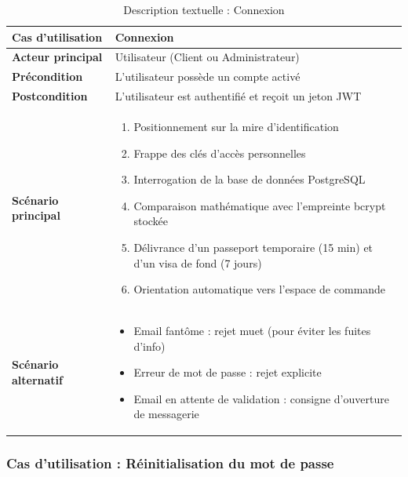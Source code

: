 \begin{table}[H]
    \centering
    \caption{Description textuelle : Connexion}
    \label{tab:desc_connexion}
    \renewcommand{\arraystretch}{1.3}
    \begin{tabular}{|p{4cm}|p{8.5cm}|}
        \hline
        \textbf{Cas d'utilisation} & Connexion \\
        \hline
        \textbf{Acteur principal} & Utilisateur (Client ou Administrateur) \\
        \hline
        \textbf{Précondition} & L'utilisateur possède un compte activé \\
        \hline
        \textbf{Postcondition} & L'utilisateur est authentifié et reçoit un jeton JWT \\
        \hline
        \textbf{Scénario principal} &
        \begin{enumerate}
            \item Positionnement sur la mire d'identification
            \item Frappe des clés d'accès personnelles
            \item Interrogation de la base de données PostgreSQL
            \item Comparaison mathématique avec l'empreinte bcrypt stockée
            \item Délivrance d'un passeport temporaire (15 min) et d'un visa de fond (7 jours)
            \item Orientation automatique vers l'espace de commande
        \end{enumerate} \\
        \hline
        \textbf{Scénario alternatif} &
        \begin{itemize}
            \item[3a.] Email fantôme : rejet muet (pour éviter les fuites d'info)
            \item[4a.] Erreur de mot de passe : rejet explicite
            \item[3b.] Email en attente de validation : consigne d'ouverture de messagerie
        \end{itemize} \\
        \hline
    \end{tabular}
\end{table}

\subsubsection{Cas d'utilisation : Réinitialisation du mot de passe}

